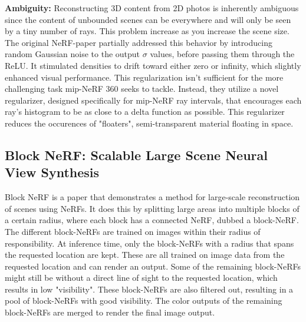 

\textbf{Ambiguity:}
Reconstructing 3D content from 2D photos is inherently ambiguous since the content of unbounded scenes can be everywhere and will only be seen by a tiny number of rays. This problem increase as you increase the scene size. The original NeRF-paper partially addressed this behavior by introducing random Gaussian noise to the output $\sigma$ values, before passing them through the ReLU. It stimulated densities to drift toward either zero or infinity, which slightly enhanced visual performance. This regularization isn't sufficient for the more challenging task mip-NeRF 360 seeks to tackle. Instead, they utilize a novel regularizer, designed specifically for mip-NeRF ray intervals, that encourages each ray's histogram to be as close to a delta function as possible. This regularizer reduces the occurences of "floaters", semi-transparent material floating in space.



\subsection{Block NeRF: Scalable Large Scene Neural View Synthesis}
Block NeRF is a paper that demonstrates a method for large-scale reconstruction of scenes using NeRFs. It does this by splitting large areas into multiple blocks of a certain radius, where each block has a connected NeRF, dubbed a block-NeRF. The different block-NeRFs are trained on images within their radius of responsibility. At inference time, only the block-NeRFs with a radius that spans the requested location are kept. These are all trained on image data from the requested location and can render an output. Some of the remaining block-NeRFs might still be without a direct line of sight to the requested location, which results in low "visibility". These block-NeRFs are also filtered out, resulting in a pool of block-NeRFs with good visibility. The color outputs of the remaining block-NeRFs are merged to render the final image output.

